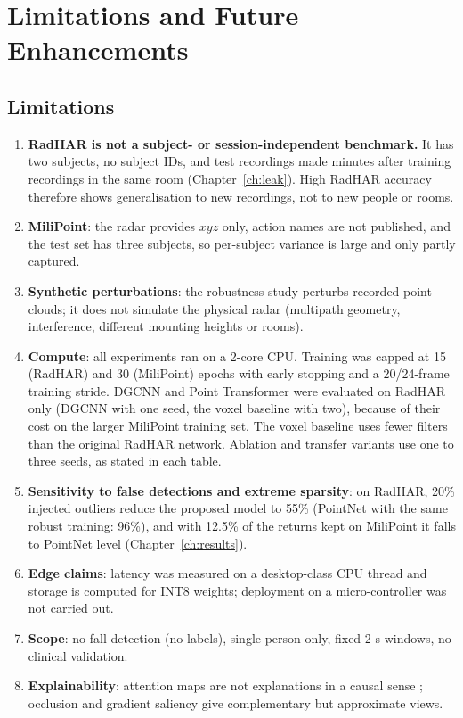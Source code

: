 \chapter{Limitations and Future Enhancements}

\section{Limitations}
\begin{enumerate}[nosep]
\item \textbf{RadHAR is not a subject- or session-independent benchmark.} It has
  two subjects, no subject IDs, and test recordings made minutes after training
  recordings in the same room (Chapter~\ref{ch:leak}). High RadHAR accuracy
  therefore shows generalisation to new recordings, not to new people or rooms.
\item \textbf{MiliPoint}: the radar provides $xyz$ only, action names are not
  published, and the test set has three subjects, so per-subject variance is
  large and only partly captured.
\item \textbf{Synthetic perturbations}: the robustness study perturbs recorded
  point clouds; it does not simulate the physical radar (multipath geometry,
  interference, different mounting heights or rooms).
\item \textbf{Compute}: all experiments ran on a 2-core CPU. Training was capped
  at 15 (RadHAR) and 30 (MiliPoint) epochs with early stopping and a 20/24-frame
  training stride. DGCNN and Point Transformer were evaluated on RadHAR only
  (DGCNN with one seed, the voxel baseline with two), because of their cost on
  the larger MiliPoint training set. The voxel baseline uses fewer filters than
  the original RadHAR network. Ablation and transfer variants use one to three
  seeds, as stated in each table.
\item \textbf{Sensitivity to false detections and extreme sparsity}: on RadHAR,
  20\% injected outliers reduce the proposed model to 55\% (PointNet with the same
  robust training: 96\%), and with 12.5\% of the returns kept on MiliPoint it
  falls to PointNet level (Chapter~\ref{ch:results}).
\item \textbf{Edge claims}: latency was measured on a desktop-class CPU thread and
  storage is computed for INT8 weights; deployment on a micro-controller was not
  carried out.
\item \textbf{Scope}: no fall detection (no labels), single person only, fixed 2-s
  windows, no clinical validation.
\item \textbf{Explainability}: attention maps are not explanations in a causal
  sense \cite{jain2019attention}; occlusion and gradient saliency give
  complementary but approximate views.
\end{enumerate}

